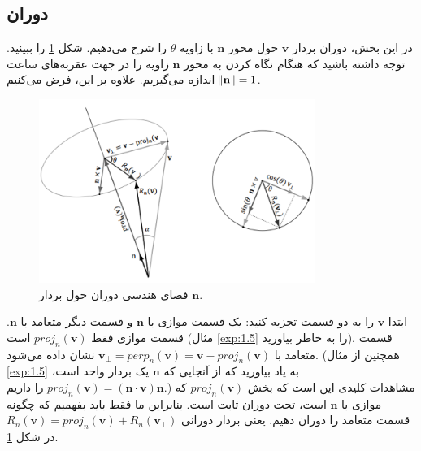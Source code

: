 \subsection{\textbf{دوران}}
\label{subsec:3.1.4}
{
    \Large
    \begin{spacing}{1.5}
        در این بخش، دوران بردار $\textbf{v}$ حول محور $\textbf{n}$ با زاویه $\theta$ را شرح می‌دهیم.
        شکل \ref{fig:4.Session.1.3.3} را ببینید.
        توجه داشته باشید که هنگام نگاه کردن به محور $\textbf{n}$ زاویه را در جهت عقربه‌های ساعت اندازه می‌گیریم.
        علاوه بر این، فرض می‌کنیم $\norm{\textbf{n}}=1$.

        \begin{figure}[H]
            \centering
            \setlength{\belowcaptionskip}{-10pt}
            \includegraphics[width=0.8\textwidth]{Images/4/3/4.Session.1.3.3}
            \caption {فضای هندسی دوران حول بردار $\textbf{n}$.}
            \label{fig:4.Session.1.3.3}
        \end{figure}

        ابتدا $\textbf{v}$ را به دو قسمت تجزیه کنید:
        یک قسمت موازی با $\textbf{n}$ و قسمت دیگر متعامد با $\textbf{n}$.
        قسمت موازی فقط $proj_{n}(\textbf{v})$ است (مثال \ref{exp:1.5} را به خاطر بیاورید).
        قسمت متعامد با $\textbf{v}_{\perp}=perp_{n}(\textbf{v})=\textbf{v}-proj_{n}(\textbf{v})$ نشان داده می‌شود.
        (همچنین از مثال \ref{exp:1.5} به یاد بیاورید که از آنجایی که $\textbf{n}$ یک بردار واحد است، $proj_{n}(\textbf{v})= (\textbf{n}\cdot\textbf{v})\textbf{n}$ را داریم.)
        مشاهدات کلیدی این است که بخش $proj_{n}(\textbf{v})$ که موازی با $\textbf{n}$ است، تحت دوران ثابت است.
        بنابراین ما فقط باید بفهمیم که چگونه قسمت متعامد را دوران دهیم. یعنی بردار دورانی $R_{n}(\textbf{v})=proj_{n}(\textbf{v})+R_{n}(\textbf{v}_{\perp})$ در شکل \ref{fig:4.Session.1.3.3}.


\end{spacing}}
